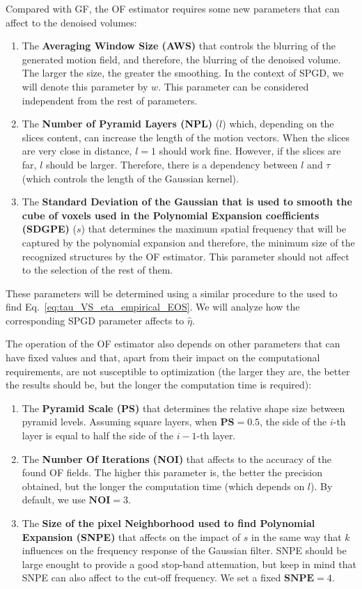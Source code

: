 \documentclass{article}
\begin{document}
Compared with GF, the OF estimator requires some new parameters
\cite{farneback2003two} that can affect to the denoised volumes:
\begin{enumerate}
\item The \textbf{Averaging Window Size (AWS)} that controls the
  blurring of the generated motion field, and therefore, the blurring
  of the denoised volume. The larger the size, the greater the
  smoothing. In the context of SPGD, we will denote this parameter by
  $w$. This parameter can be considered independent from the rest of
  parameters.
\item The \textbf{Number of Pyramid Layers (NPL)} ($l$) which,
  depending on the slices content, can increase the length of the
  motion vectors. When the slices are very close in distance, $l=1$
  should work fine. However, if the slices are far, $l$ should be
  larger. Therefore, there is a dependency between $l$ and $\tau$
  (which controls the length of the Gaussian kernel).
\item The \textbf{Standard Deviation of the Gaussian that is used to
    smooth the cube of voxels used in the Polynomial Expansion
    coefficients (SDGPE)} ($s$) that determines the maximum spatial
  frequency that will be captured by the polynomial expansion and
  therefore, the minimum size of the recognized structures by the OF
  estimator. This parameter should not affect to the selection of the
  rest of them.
\end{enumerate}
These parameters will be determined using a similar procedure to the
used to find Eq.~\ref{eq:tau_VS_eta_empirical_EOS}. We will analyze how the corresponding SPGD parameter affects to $\hat{\eta}$.

The operation of the OF estimator also depends on other parameters
that can have fixed values and that, apart from their impact on the
computational requirements, are not susceptible to optimization (the
larger they are, the better the results should be, but the longer the
computation time is required):
\begin{enumerate}
\item The \textbf{Pyramid Scale (PS)} that determines the relative
  shape size between pyramid levels. Assuming square layers, when
  $\mathbf{PS}=0.5$, the side of the $i$-th layer is equal to half the
  side of the $i-1$-th layer.
\item The \textbf{Number Of Iterations (NOI)} that affects to the
  accuracy of the found OF fields. The higher this parameter is, the
  better the precision obtained, but the longer the computation time
  (which depends on $l$). By default, we use $\mathbf{NOI}=3$.
\item The \textbf{Size of the pixel Neighborhood used to find
    Polynomial Expansion (SNPE)} that affects on the impact of $s$ in
  the same way that $k$ influences on the frequency response of the
  Gaussian filter. SNPE should be large enought to provide a good
  stop-band attenuation, but keep in mind that SNPE can also affect to
  the cut-off frequency. We set a fixed $\mathbf{SNPE}=4$.
\end{enumerate}
\end{document}
